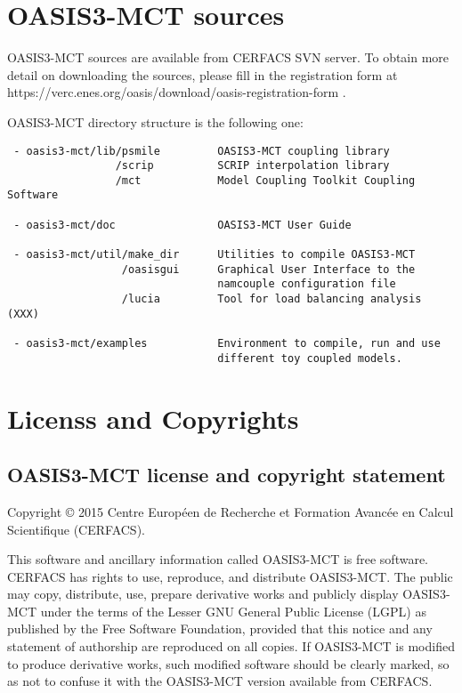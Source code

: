 \section{OASIS3-MCT sources}
\label{sec_Obtaining}
OASIS3-MCT sources are available from CERFACS SVN server. To obtain more detail on downloading
the sources, please fill in the registration form at
https://verc.enes.org/oasis/download/oasis-registration-form .

OASIS3-MCT directory structure is the following one:

\begin{verbatim}
 - oasis3-mct/lib/psmile         OASIS3-MCT coupling library
                 /scrip          SCRIP interpolation library
                 /mct            Model Coupling Toolkit Coupling Software
                  
 - oasis3-mct/doc                OASIS3-MCT User Guide

 - oasis3-mct/util/make_dir      Utilities to compile OASIS3-MCT
                  /oasisgui      Graphical User Interface to the
                                 namcouple configuration file
                  /lucia         Tool for load balancing analysis (XXX)

 - oasis3-mct/examples           Environment to compile, run and use
                                 different toy coupled models. 
\end{verbatim}
\newpage
\section{Licenss and Copyrights}
 
\subsection{OASIS3-MCT license and copyright statement}

Copyright © 2015 Centre Europ\'een de Recherche et Formation
Avanc\'ee en Calcul Scientifique (CERFACS).  

This software and ancillary information called OASIS3-MCT is free
software.  CERFACS has rights to use, reproduce, and distribute
OASIS3-MCT. The public may copy, distribute, use, prepare derivative works and
publicly display OASIS3-MCT under the terms of the Lesser GNU General
Public License (LGPL) as published by the Free Software Foundation,
provided that this notice and any statement of authorship are
reproduced on all copies. If OASIS3-MCT is modified to produce derivative
works, such modified software should be clearly marked, so as not to
confuse it with the OASIS3-MCT version available from CERFACS.

